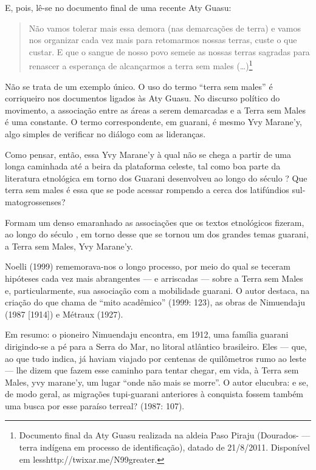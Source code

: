 E, pois, lê-se no documento final de uma recente Aty Guasu:

\begin{quotation}
Não vamos tolerar mais essa demora (nas demarcações de terra) e vamos
nos organizar cada vez mais para retomarmos nossas terras, custe o que
custar. E que o sangue de nosso povo semeie as nossas terras sagradas
para renascer a esperança de alcançarmos a terra sem males
(\ldots{})\footnote{Documento final da Aty Guasu realizada na aldeia Paso
Piraju (Dourados- --- terra indígena em processo de identificação),
datado de 21/8/2011. Disponível em
{less}http://twixar.me/N99{greater}.}
\end{quotation}

Não se trata de um exemplo único. O uso do termo ``terra sem males'' é
corriqueiro nos documentos ligados às Aty Guasu. No discurso político
do movimento, a associação entre as áreas a serem demarcadas e a Terra
sem Males é uma constante. O termo correspondente, em guarani, é mesmo
Yvy Marane’y, algo simples de verificar no diálogo com as lideranças.

Como pensar, então, essa Yvy Marane’y à qual não se chega a partir de
uma longa caminhada até a beira da plataforma celeste, tal como boa
parte da literatura etnológica em torno dos Guarani desenvolveu ao
longo do século ? Que terra sem males é essa que se pode acessar
rompendo a cerca dos latifúndios sul-matogrossenses?

Formam um denso emaranhado as associações que os textos etnológicos
fizeram, ao longo do século , em torno desse que se tornou um dos
grandes temas guarani, a Terra sem Males, Yvy Marane’y.

Noelli (1999) rememorava-nos o longo processo, por meio do qual se
teceram hipóteses cada vez mais abrangentes --- e arriscadas --- sobre a
Terra sem Males e, particularmente, sua associação com a mobilidade
guarani. O autor destaca, na criação do que chama de ``mito acadêmico''
(1999: 123), as obras de Nimuendaju (1987 [1914]) e Métraux (1927).

Em resumo: o pioneiro Nimuendaju encontra, em 1912, uma família guarani
dirigindo-se a pé para a Serra do Mar, no litoral atlântico brasileiro.
Eles --- que, ao que tudo indica, já haviam viajado por centenas de
quilômetros rumo ao leste --- lhe dizem que fazem esse caminho para
tentar chegar, em vida, à Terra sem Males, yvy marane’y, um lugar ``onde
não mais se morre''. O autor elucubra: e se, de modo geral, as migrações
tupi-guarani anteriores à conquista fossem também uma busca por esse
paraíso terreal? (1987: 107).

